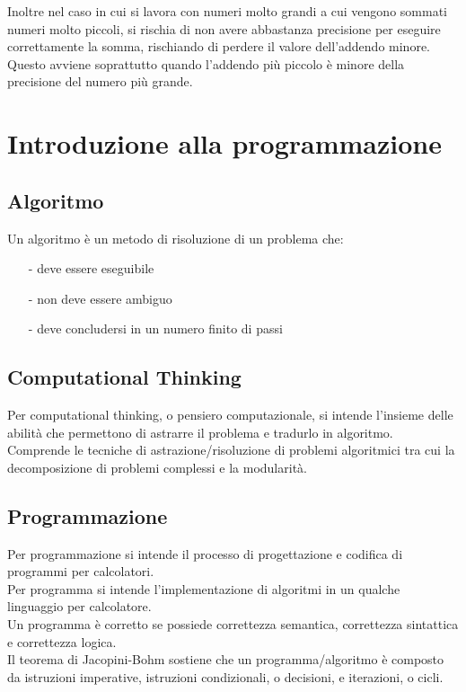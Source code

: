\documentclass[a4paper]{article}
\begin{document}
Inoltre nel caso in cui si lavora con numeri molto grandi a cui vengono sommati numeri molto piccoli, si rischia di
non avere abbastanza precisione per eseguire correttamente la somma, rischiando di perdere il valore dell'addendo minore.
Questo avviene soprattutto quando l'addendo più piccolo è minore della precisione del numero più grande.

\newpage

\section{Introduzione alla programmazione}

\subsection{Algoritmo}
Un algoritmo è un metodo di risoluzione di un problema che:
\begin{itemize}[topsep=3pt, itemsep=0pt]
	\item[-] deve essere eseguibile
	\item[-] non deve essere ambiguo
	\item[-] deve concludersi in un numero finito di passi
\end{itemize}

\subsection{Computational Thinking}
Per computational thinking, o pensiero computazionale, si intende l'insieme delle abilità che permettono di astrarre
il problema e tradurlo in algoritmo. Comprende le tecniche di astrazione/risoluzione di problemi algoritmici tra
cui la decomposizione di problemi complessi e la modularità.

\subsection{Programmazione}
Per programmazione si intende il processo di progettazione e codifica di programmi per calcolatori. \\
Per programma si intende l'implementazione di algoritmi in un qualche linguaggio per calcolatore. \\
Un programma è corretto se possiede correttezza semantica, correttezza sintattica e correttezza logica. \\
Il teorema di Jacopini-Bohm sostiene che un programma/algoritmo è composto da istruzioni imperative, istruzioni condizionali,
o decisioni, e iterazioni, o cicli.
\end{document}
